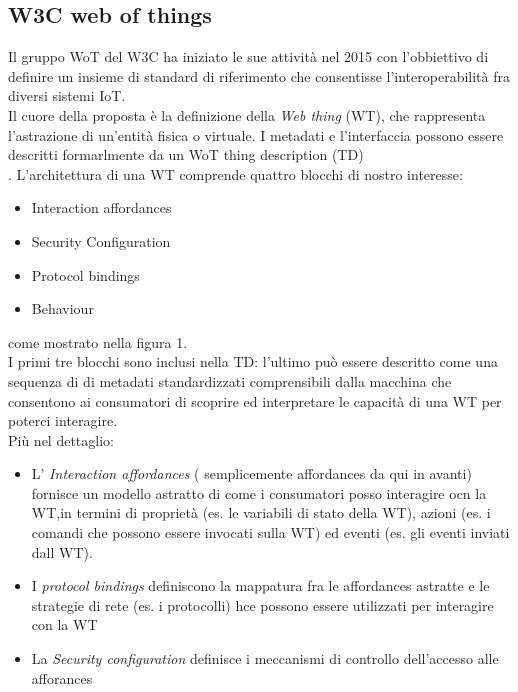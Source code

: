 \documentclass[11pt]{article}
\begin{document}
 	\subsection{W3C web of things}
 	Il gruppo WoT del W3C ha iniziato le sue attività nel 2015 con l'obbiettivo di definire un insieme di standard di riferimento che consentisse l'interoperabilità fra diversi sistemi IoT. \\
 	Il cuore della proposta è la definizione della \textit{Web thing} (WT), che rappresenta l'astrazione di un'entità fisica o virtuale.
 	I metadati e l'interfaccia possono essere descritti formarlmente da un WoT thing description (TD) \\.
 	L'architettura di una WT comprende quattro blocchi di nostro interesse:
 	\begin{itemize}
 		\item Interaction affordances
 		\item Security Configuration
 		\item Protocol bindings
 		\item Behaviour
 	\end{itemize}
 	come mostrato nella figura 1. \\
 	I primi tre blocchi sono inclusi nella TD: l'ultimo può essere descritto come una sequenza di di metadati standardizzati comprensibili dalla macchina che consentono ai consumatori di scoprire ed interpretare le capacità di una WT per poterci interagire.
 	\\ Più nel
 	dettaglio:
 	\begin{itemize}
 		\item L' \textit{Interaction affordances} ( semplicemente affordances da qui in avanti) fornisce un modello astratto di  come i consumatori posso interagire ocn la WT,in termini di proprietà (es. le variabili di stato della WT), azioni (es. i comandi che possono essere invocati sulla WT) ed eventi (es. gli eventi inviati dall WT).
 		\item I \textit{protocol bindings} definiscono la mappatura fra le affordances astratte e le strategie di rete (es. i protocolli) hce possono essere utilizzati per interagire con la WT
 		\item La \textit{Security configuration} definisce i meccanismi di controllo dell'accesso alle afforances
 	\end{itemize}
 
\end{document}
